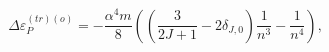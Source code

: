 \begin{equation}
\Delta \varepsilon _{P}^{\left( tr\right) \left( o\right) }=-\frac{\alpha
^{4}m}{8}\left( \left( \frac{3}{2J+1}-2\delta _{J,0}\right) \frac{1}{n^{3}}-%
\frac{1}{n^{4}}\right) ,
\end{equation}

